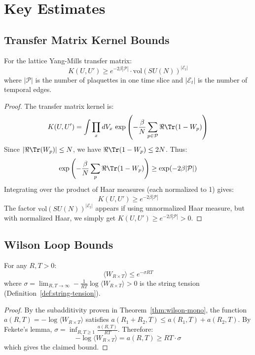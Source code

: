 \section{Key Estimates}
\label{app:estimates}

\subsection{Transfer Matrix Kernel Bounds}

\begin{lemma}
For the lattice Yang-Mills transfer matrix:
\[
K(U, U') \geq e^{-2\beta |\mathcal{P}|} \cdot \text{vol}(SU(N))^{|\mathcal{E}_t|}
\]
where $|\mathcal{P}|$ is the number of plaquettes in one time slice and 
$|\mathcal{E}_t|$ is the number of temporal edges.
\end{lemma}

\begin{proof}
The transfer matrix kernel is:
\[
K(U, U') = \int \prod_{x} dV_x \, \exp\left(-\frac{\beta}{N}\sum_{p \in \mathcal{P}} \Re\Tr(1 - W_p)\right)
\]
Since $|\Re\Tr(W_p)| \leq N$, we have $\Re\Tr(1 - W_p) \leq 2N$. Thus:
\[
\exp\left(-\frac{\beta}{N}\sum_p \Re\Tr(1-W_p)\right) \geq \exp(-2\beta|\mathcal{P}|)
\]
Integrating over the product of Haar measures (each normalized to 1) gives:
\[
K(U, U') \geq e^{-2\beta|\mathcal{P}|}
\]
The factor $\text{vol}(SU(N))^{|\mathcal{E}_t|}$ appears if using unnormalized 
Haar measure, but with normalized Haar, we simply get $K(U,U') \geq e^{-2\beta|\mathcal{P}|} > 0$.
\end{proof}

\subsection{Wilson Loop Bounds}

\begin{lemma}
For any $R, T > 0$:
\[
\langle W_{R \times T} \rangle \leq e^{-\sigma RT}
\]
where $\sigma = \lim_{R,T \to \infty} -\frac{1}{RT}\log\langle W_{R \times T}\rangle > 0$ 
is the string tension (Definition~\ref{def:string-tension}).
\end{lemma}

\begin{proof}
By the subadditivity proven in Theorem~\ref{thm:wilson-mono}, the function 
$a(R,T) = -\log\langle W_{R \times T}\rangle$ satisfies $a(R_1+R_2, T) \leq a(R_1, T) + a(R_2, T)$.
By Fekete's lemma, $\sigma = \inf_{R,T \geq 1} \frac{a(R,T)}{RT}$. Therefore:
\[
-\log\langle W_{R \times T}\rangle = a(R,T) \geq RT \cdot \sigma
\]
which gives the claimed bound.
\end{proof}

